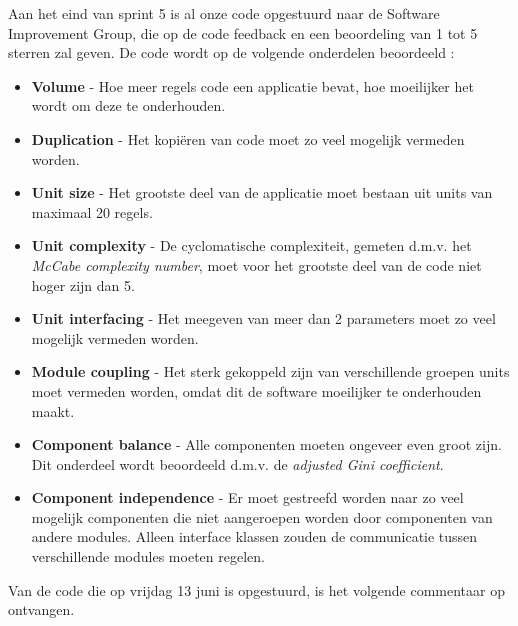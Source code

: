 Aan het eind van sprint 5 is al onze code opgestuurd naar de Software Improvement Group, die op de code feedback en een beoordeling van 1 tot 5 sterren zal geven. De code wordt op de volgende onderdelen beoordeeld \cite{sigmanual}:
\begin{itemize}
\item \textbf{Volume} - Hoe meer regels code een applicatie bevat, hoe moeilijker het wordt om deze te onderhouden.
\item \textbf{Duplication} - Het kopi\"eren van code moet zo veel mogelijk vermeden worden.
\item \textbf{Unit size} - Het grootste deel van de applicatie moet bestaan uit units van maximaal 20 regels.
\item \textbf{Unit complexity} - De cyclomatische complexiteit, gemeten d.m.v. het \emph{McCabe complexity number}, moet voor het grootste deel van de code niet hoger zijn dan 5.
\item \textbf{Unit interfacing} - Het meegeven van meer dan 2 parameters moet zo veel mogelijk vermeden worden.
\item \textbf{Module coupling} - Het sterk gekoppeld zijn van verschillende groepen units moet vermeden worden, omdat dit de software moeilijker te onderhouden maakt.
\item \textbf{Component balance} - Alle componenten moeten ongeveer even groot zijn. Dit onderdeel wordt beoordeeld d.m.v. de \emph{adjusted Gini coefficient}.
\item \textbf{Component independence} - Er moet gestreefd worden naar zo veel mogelijk componenten die niet aangeroepen worden door componenten van andere modules. Alleen interface klassen zouden de communicatie tussen verschillende modules moeten regelen.
\end{itemize}

Van de code die op vrijdag 13 juni is opgestuurd, is het volgende commentaar op ontvangen.

